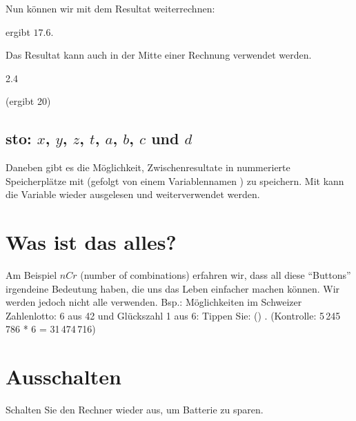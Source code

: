 Nun können wir mit dem Resultat weiterrechnen: 

   ergibt $17.6$.

Das Resultat kann auch in der Mitte einer Rechnung verwendet werden.

2.4    

(ergibt 20)


\subsection{sto: $x$, $y$, $z$, $t$, $a$, $b$, $c$ und $d$}
Daneben gibt es die Möglichkeit, Zwischenresultate in nummerierte
Speicherplätze mit  (gefolgt von einem
Variablennamen ) zu
speichern. Mit   kann die Variable wieder
ausgelesen und weiterverwendet werden.


\section{Was ist das alles?}
Am Beispiel $nCr$ (number of combinations) erfahren wir, dass all
diese ``Buttons'' irgendeine Bedeutung haben, die uns das Leben
einfacher machen können. Wir werden jedoch nicht alle verwenden.
Bsp.: Möglichkeiten im Schweizer Zahlenlotto: 6
aus 42 und Glückszahl 1 aus 6:
Tippen Sie: ()   
  
. (Kontrolle: 5\,245\,786 * 6 = 31\,474\,716)

\section{Ausschalten}
Schalten Sie den Rechner wieder aus, um Batterie zu sparen.



